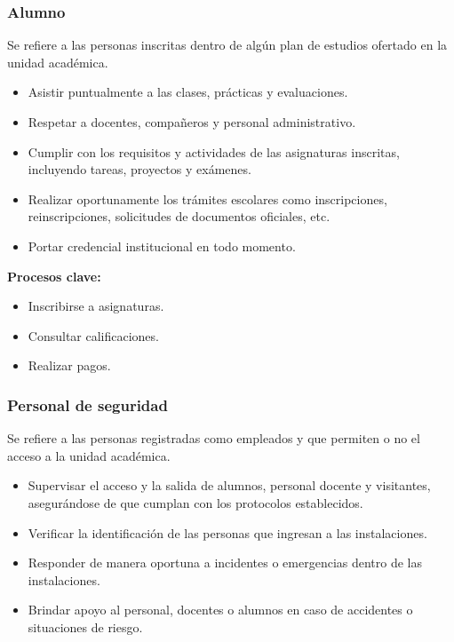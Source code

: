 \begin{Usuario}{\hypertarget{tAlumno}{\subsubsection{Alumno}}}{
    Se refiere a las personas inscritas dentro de algún plan de estudios ofertado en la unidad académica.
}

\item[Responsabilidades:] \cdtEmpty
\begin{itemize}
    \item Asistir puntualmente a las clases, prácticas y evaluaciones.
    \item Respetar a docentes, compañeros y personal administrativo.
    \item Cumplir con los requisitos y actividades de las asignaturas inscritas, incluyendo tareas, proyectos y exámenes.
    \item Realizar oportunamente los trámites escolares como inscripciones, reinscripciones, solicitudes de documentos oficiales, etc.
    \item Portar credencial institucional en todo momento.
\end{itemize}
\textbf{Procesos clave:} \cdtEmpty
\begin{itemize}
    \item Inscribirse a asignaturas.
    \item Consultar calificaciones.
    \item Realizar pagos.
\end{itemize}
\end{Usuario}

\begin{Usuario}{\hypertarget{tPersonalSeguridad}{\subsubsection{Personal de seguridad}}}{
    Se refiere a las personas registradas como empleados y que permiten o no el acceso a la unidad académica.
}


\item[Responsabilidades:] \cdtEmpty
\begin{itemize}
    \item Supervisar el acceso y la salida de alumnos, personal docente y visitantes, asegurándose de que cumplan con los protocolos establecidos.
    \item Verificar la identificación de las personas que ingresan a las instalaciones.
    \item Responder de manera oportuna a incidentes o emergencias dentro de las instalaciones.
    \item Brindar apoyo al personal, docentes o alumnos en caso de accidentes o situaciones de riesgo.
\end{itemize}
\end{Usuario}

